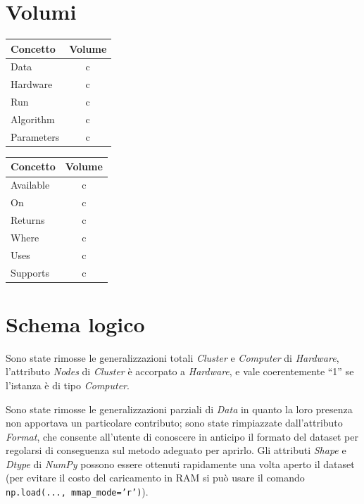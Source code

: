 \documentclass{article}
\begin{document}
\section{Volumi}
\begin{table}[H]
    \begin{minipage}{.5\linewidth}
      \vspace{-1cm}
      \centering
      \begin{tabular}{||l c||}
        \hline
        Concetto & Volume \\ [0.5ex]
        \hline\hline
        Data & c\\
        Hardware & c\\
        Run & c\\
        Algorithm & c\\
        Parameters & c\\
        \hline
       \end{tabular}
    \end{minipage}
    \begin{minipage}{.5\linewidth}
      \vspace{-0.55cm}
      \centering
        \begin{tabular}{||l c||}
            \hline
            Concetto & Volume \\ [0.5ex]
            \hline\hline
            Available & c\\
            On & c\\
            Returns & c\\
            Where & c\\
            Uses & c\\
            Supports & c\\
            \hline
           \end{tabular}
    \end{minipage}
\end{table}

\section{Schema logico}
Sono state rimosse le generalizzazioni totali \emph{Cluster} e \emph{Computer} di \emph{Hardware}, l'attributo \emph{Nodes} di \emph{Cluster} è accorpato a \emph{Hardware}, e vale coerentemente ``1'' se l'istanza è di tipo \emph{Computer}.

Sono state rimosse le generalizzazioni parziali di \emph{Data} in quanto la loro presenza non apportava un particolare contributo; sono state rimpiazzate dall'attributo \emph{Format}, che consente all'utente di conoscere in anticipo il formato del dataset per regolarsi di conseguenza sul metodo adeguato per aprirlo. Gli attributi \emph{Shape} e \emph{Dtype} di \emph{NumPy} possono essere ottenuti rapidamente una volta aperto il dataset (per evitare il costo del caricamento in RAM si può usare il comando \texttt{np.load(..., mmap\_mode='r')}).
\end{document}
